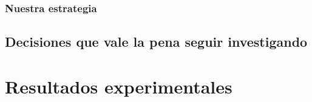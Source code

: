 \subsubsection{Nuestra estrategia}

\subsection{Decisiones que vale la pena seguir investigando}

\section{Resultados experimentales}